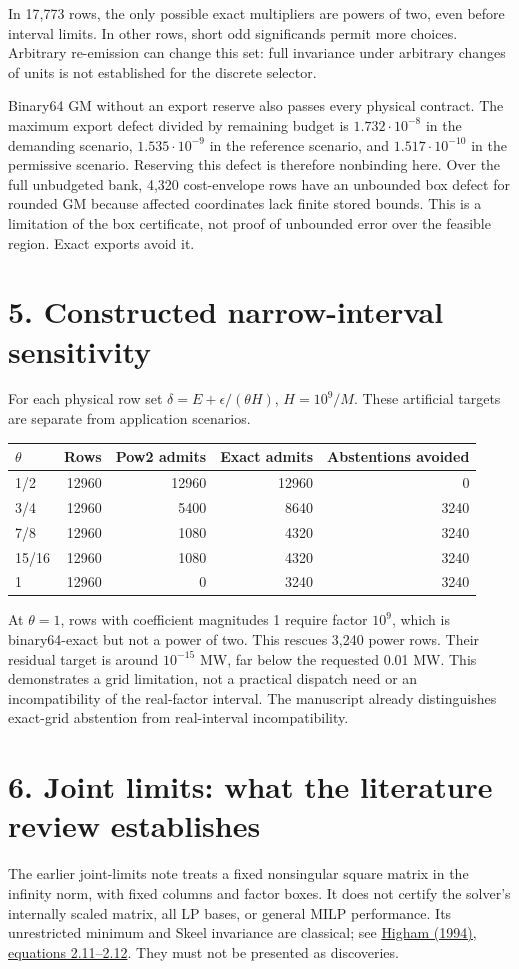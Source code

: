 \documentclass[10pt,a4paper]{article}
\begin{document}
In 17,773 rows, the only possible exact multipliers are powers of two, even
before interval limits. In other rows, short odd significands permit more
choices. Arbitrary re-emission can change this set: full invariance under
arbitrary changes of units is not established for the discrete selector.

Binary64 GM without an export reserve also passes every physical contract.
The maximum export defect divided by remaining budget is $1.732\cdot10^{-8}$
in the demanding scenario, $1.535\cdot10^{-9}$ in the reference scenario, and
$1.517\cdot10^{-10}$ in the permissive scenario. Reserving this defect is
therefore nonbinding here. Over the full unbudgeted bank, 4,320 cost-envelope
rows have an unbounded box defect for rounded GM because affected coordinates
lack finite stored bounds. This is a limitation of the box certificate, not
proof of unbounded error over the feasible region. Exact exports avoid it.

\section*{5. Constructed narrow-interval sensitivity}
For each physical row set $\delta=E+\epsilon/(\theta H)$, $H=10^9/M$.
These artificial targets are separate from application scenarios.

\begin{center}\small
\begin{tabular}{lrrrr}\toprule
$\theta$&Rows&Pow2 admits&Exact admits&Abstentions avoided\\\midrule
1/2&12960&12960&12960&0\\
3/4&12960&5400&8640&3240\\
7/8&12960&1080&4320&3240\\
15/16&12960&1080&4320&3240\\
1&12960&0&3240&3240\\\bottomrule
\end{tabular}\end{center}

At $\theta=1$, rows with coefficient magnitudes 1 require factor $10^9$,
which is binary64-exact but not a power of two. This rescues 3,240 power rows.
Their residual target is around $10^{-15}$ MW, far below the requested
0.01 MW. This demonstrates a grid limitation, not a practical dispatch need
or an incompatibility of the real-factor interval. The manuscript already
distinguishes exact-grid abstention from real-interval incompatibility.
\newpage
\section*{6. Joint limits: what the literature review establishes}
The earlier joint-limits note treats a fixed nonsingular square matrix in the
infinity norm, with fixed columns and factor boxes. It does not certify the
solver's internally scaled matrix, all LP bases, or general MILP performance.
Its unrestricted minimum and Skeel invariance are classical; see
\href{https://eprints.maths.manchester.ac.uk/651/1/SURVEY.pdf}{Higham (1994),
equations 2.11--2.12}. They must not be presented as discoveries.
\end{document}
